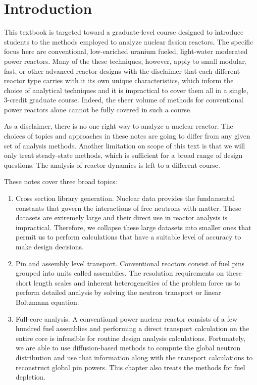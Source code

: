 \tableofcontents

\clearpage
{}
\setcounter{page}{1}
\chapter*{Introduction}

This textbook is targeted toward a graduate-level course designed to introduce students to the methods employed to analyze nuclear fission reactors. The specific focus here are conventional, low-enriched uranium fueled, light-water moderated power reactors. Many of the these techniques, however, apply to small modular, fast, or other advanced reactor designs with the disclaimer that each different reactor type carries with it its own unique characteristics, which inform the choice of analytical techniques and it is impractical to cover them all in a single, 3-credit graduate course. Indeed, the sheer volume of methods for conventional power reactors alone cannot be fully covered in such a course. 

As a disclaimer, there is no one right way to analyze a nuclear reactor. The choices of topics and approaches in these notes are going to differ from any given set of analysis methods. Another limitation on scope of this text is that we will only treat steady-state methods, which is sufficient for a broad range of design questions. The analysis of reactor dynamics is left to a different course.

These notes cover three broad topics:
\begin{enumerate}
  \item Cross section library generation. Nuclear data provides the fundamental constants that govern the interactions of free neutrons with matter. These datasets are extremely large and their direct use in reactor analysis is impractical. Therefore, we collapse these large datasets into smaller ones that permit us to perform calculations that have a suitable level of accuracy to make design decisions.
  \item Pin and assembly level transport. Conventional reactors consist of fuel pins grouped into units called assemblies. The resolution requirements on these short length scales and inherent heterogeneities of the problem force us to perform detailed analysis by solving the neutron transport or linear Boltzmann equation.
  \item Full-core analysis. A conventional power nuclear reactor consists of a few hundred fuel assemblies and performing a direct transport calculation on the entire core is infeasible for routine design analysis calculations. Fortunately, we are able to use diffusion-based methods to compute the global neutron distribution and use that information along with the transport calculations to reconstruct global pin powers. This chapter also treats the methods for fuel depletion.
\end{enumerate} 

